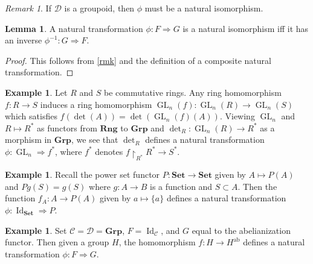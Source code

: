 \documentclass[10pt,letterpaper,cm]{nupset}
\theoremstyle{definition}
\newtheorem{exmp}[definition]{Example}
\theoremstyle{theorem}
\newtheorem{lemma}[theorem]{Lemma}
\theoremstyle{remark}
\newtheorem{remark}{Remark}
\newcommand{\1}{\mathbf{1}}
\renewcommand{\c}{\mathscr{C}}
\renewcommand{\d}{\mathscr{D}}
\newcommand{\0}{\vec 0}
\DeclareMathOperator*{\GL}{GL}
\DeclareMathOperator{\id}{Id}
\DeclareMathOperator{\ab}{ab}
\begin{document}
\begin{remark}
If $\d$ is a groupoid, then $\phi$ must be a natural isomorphism.
\end{remark}

\begin{lemma}
A natural transformation $\phi: F \Rightarrow G$ is a natural isomorphism iff it has an inverse $\phi^{{-}1} : G \Rightarrow F$.
\end{lemma}
\begin{proof}
This follows from \cref{rmk} and the definition of a composite natural transformation.
\end{proof}

\begin{exmp}
Let $R$ and $S$ be commutative rings. Any ring homomorphism $f: R \to S$ induces a ring homomorphism $\GL_n(f): \GL_n(R) \to \GL_n(S)$ which satisfies $f(\det(A)) = \det(\GL_n(f)(A))$. Viewing $\GL_n$ and $R \mapsto R^{\ast}$ as functors from $\mathbf{Rng}$ to $\mathbf{Grp}$ and $\det_R : \GL_n(R) \to R^{\ast}$ as a morphism in $\mathbf{Grp}$, we see that $\det_R$ defines a natural transformation $\phi : \GL_n \Rightarrow f^{\ast}$, where $f^{\ast}$ denotes $f\restriction_{R^{\ast}} R^{\ast} \to S^{\ast}$.  

\begin{center}
\end{center}
\end{exmp}

\begin{exmp}
Recall the power set functor $P: \mathbf{Set} \to \mathbf{Set}$ given by $A \mapsto P(A)$ and $Pg(S) = g(S)$ where $g: A \to B$ is a function and $S\subset A$. Then the function $f_A: A \to P(A)$ given by $a \mapsto \{a\}$ defines a natural transformation $\phi: \id_{\mathbf{Set}} \Rightarrow P$.
\end{exmp}

\begin{exmp}
Set $\c = \d = \mathbf{Grp}$, $F= \id_{\c}$, and $G$ equal to the abelianization functor. Then given a group $H$, the homomorphism $f: H \to H^{\ab}$ defines a natural transformation $\phi: F \Rightarrow G$.
\end{exmp}
\end{document}
